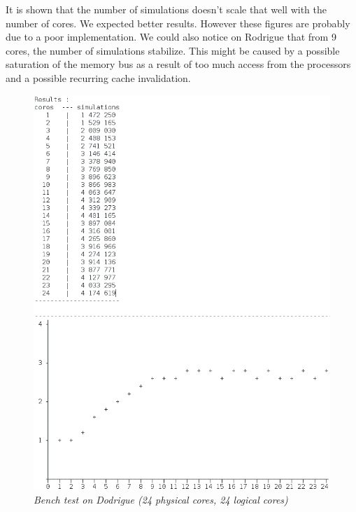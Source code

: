 It is shown that the number of simulations doesn't scale that well with the number of cores. We expected better results. However these figures are probably due to a poor implementation.
We could also notice on Rodrigue that from 9 cores, the number of simulations stabilize. This might be caused by a possible  saturation of the memory bus as a result of too much access from the processors and a possible recurring cache invalidation.

\begin{figure}[H] 
\centerline{\includegraphics[width=\textwidth]{Optimisations/bench_rodrigue.png}}
\caption{\label{fig:Defrag}\textit{Bench test on Dodrigue (24 physical cores, 24 logical cores)}}
\end{figure}


